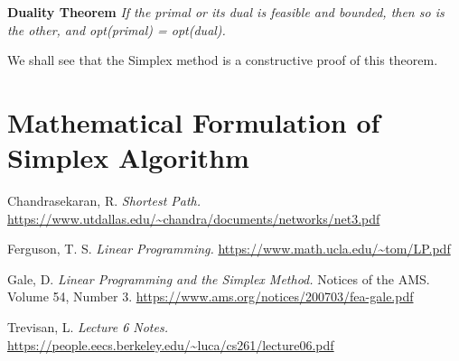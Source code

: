 \documentclass[12pt]{article}
\begin{document}
\textbf{Duality Theorem} \textit{If the primal or its dual is feasible and bounded, then so is the other, and opt(primal) = opt(dual).}

We shall see that the Simplex method is a constructive proof of this theorem.

\section{Mathematical Formulation of Simplex Algorithm}


\begin{thebibliography}{9}

Chandrasekaran, R. 
\textit{Shortest Path.} 
\url{https://www.utdallas.edu/~chandra/documents/networks/net3.pdf}

Ferguson, T. S.
\textit{Linear Programming.}
\url{https://www.math.ucla.edu/~tom/LP.pdf}

Gale, D.
\textit{Linear Programming and the Simplex Method.}
Notices of the AMS. 
Volume 54, Number 3.
\url{https://www.ams.org/notices/200703/fea-gale.pdf}

Trevisan, L.
\textit{Lecture 6 Notes.}
\url{https://people.eecs.berkeley.edu/~luca/cs261/lecture06.pdf}

\end{thebibliography}
\end{document}
